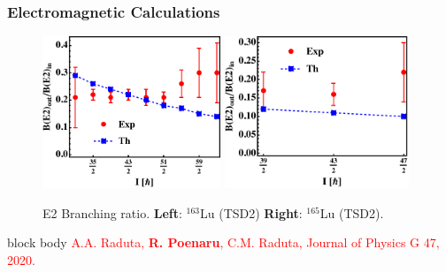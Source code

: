 \documentclass{beamer}
\begin{document}
\begin{frame}
	\frametitle{Electromagnetic Calculations}
	\begin{figure}
		\centering
		\includegraphics[width=0.475\textwidth]{figures/BE2inout-1.pdf}
		\includegraphics[width=0.49\textwidth]{figures/BE2inout-2.pdf}
		\caption{E2 Branching ratio. \textbf{Left}: $^{163}$Lu (TSD2) \textbf{Right}: $^{165}$Lu (TSD2).}
	\end{figure}
	\begin{beamercolorbox}[rounded=true,shadow=false, wd=\linewidth,]{block body}
		\centering
		\textcolor{red}{\footnotesize{A.A. Raduta, \textbf{R. Poenaru}, C.M. Raduta, Journal of Physics G 47, 2020.}}
	\end{beamercolorbox}
\end{frame}
\end{document}
